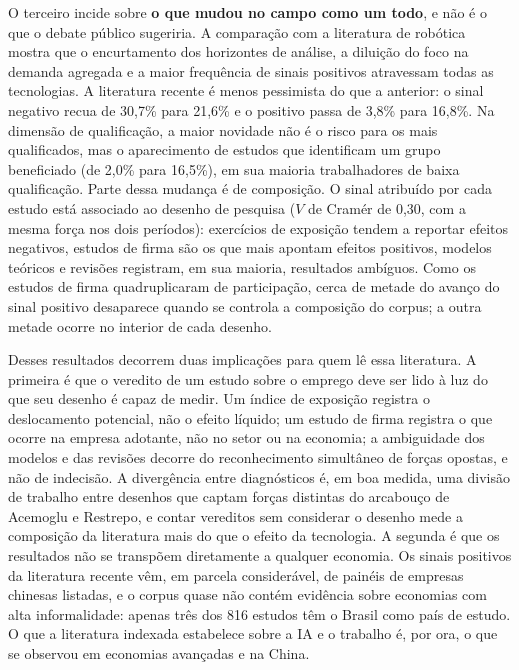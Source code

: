 O terceiro incide sobre \textbf{o que mudou no campo como um todo}, e não é o que o debate público sugeriria. A comparação com a literatura de robótica mostra que o encurtamento dos horizontes de análise, a diluição do foco na demanda agregada e a maior frequência de sinais positivos atravessam todas as tecnologias. A literatura recente é menos pessimista do que a anterior: o sinal negativo recua de 30,7\% para 21,6\% e o positivo passa de 3,8\% para 16,8\%. Na dimensão de qualificação, a maior novidade não é o risco para os mais qualificados, mas o aparecimento de estudos que identificam um grupo beneficiado (de 2,0\% para 16,5\%), em sua maioria trabalhadores de baixa qualificação. Parte dessa mudança é de composição. O sinal atribuído por cada estudo está associado ao desenho de pesquisa ($V$ de Cramér de 0,30, com a mesma força nos dois períodos): exercícios de exposição tendem a reportar efeitos negativos, estudos de firma são os que mais apontam efeitos positivos, modelos teóricos e revisões registram, em sua maioria, resultados ambíguos. Como os estudos de firma quadruplicaram de participação, cerca de metade do avanço do sinal positivo desaparece quando se controla a composição do corpus; a outra metade ocorre no interior de cada desenho.


Desses resultados decorrem duas implicações para quem lê essa literatura. A primeira é que o veredito de um estudo sobre o emprego deve ser lido à luz do que seu desenho é capaz de medir. Um índice de exposição registra o deslocamento potencial, não o efeito líquido; um estudo de firma registra o que ocorre na empresa adotante, não no setor ou na economia; a ambiguidade dos modelos e das revisões decorre do reconhecimento simultâneo de forças opostas, e não de indecisão. A divergência entre diagnósticos é, em boa medida, uma divisão de trabalho entre desenhos que captam forças distintas do arcabouço de Acemoglu e Restrepo, e contar vereditos sem considerar o desenho mede a composição da literatura mais do que o efeito da tecnologia. A segunda é que os resultados não se transpõem diretamente a qualquer economia. Os sinais positivos da literatura recente vêm, em parcela considerável, de painéis de empresas chinesas listadas, e o corpus quase não contém evidência sobre economias com alta informalidade: apenas três dos 816 estudos têm o Brasil como país de estudo. O que a literatura indexada estabelece sobre a IA e o trabalho é, por ora, o que se observou em economias avançadas e na China.

